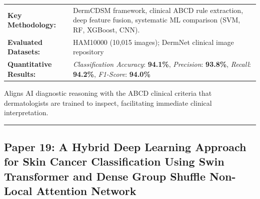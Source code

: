 \documentclass[10pt,a4paper]{article}
\begin{document}
\vspace{4pt}
\begin{tabularx}{\linewidth}{p{3.2cm}X}
\toprule
\textbf{Key Methodology:} & DermCDSM framework, clinical ABCD rule extraction, deep feature fusion, systematic ML comparison (SVM, RF, XGBoost, CNN). \\
\textbf{Evaluated Datasets:} & HAM10000 (10,015 images); DermNet clinical image repository \\
\textbf{Quantitative Results:} & \textit{Classification Accuracy}: \textbf{94.1\%}, \textit{Precision}: \textbf{93.8\%}, \textit{Recall}: \textbf{94.2\%}, \textit{F1-Score}: \textbf{94.0\%} \\
\bottomrule
\end{tabularx}
\vspace{4pt}
\begin{tcolorbox}[utilitybox,title=Clinical Utility and Real-World Impact]
Aligns AI diagnostic reasoning with the ABCD clinical criteria that dermatologists are trained to inspect, facilitating immediate clinical interpretation.
\end{tcolorbox}
\vspace{12pt}
\hrule
\vspace{12pt}
\subsection*{Paper 19: A Hybrid Deep Learning Approach for Skin Cancer Classification Using Swin Transformer and Dense Group Shuffle Non-Local Attention Network}
\end{document}
